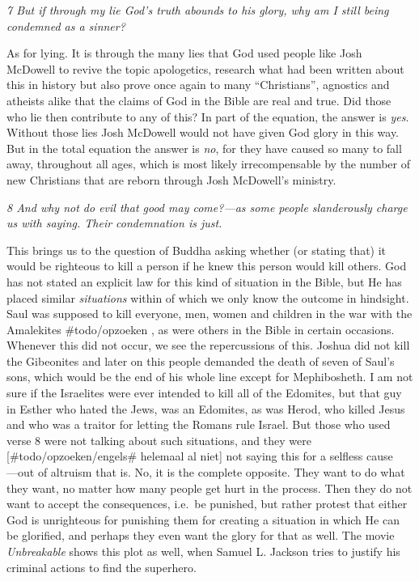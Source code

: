 \emph{7 But if through my lie God's truth abounds to his glory, why am I
still being condemned as a sinner?}

As for lying. It is through the many lies that God used people like Josh
McDowell to revive the topic apologetics, research what had been written
about this in history but also prove once again to many ``Christians'',
agnostics and atheists alike that the claims of God in the Bible are
real and true. Did those who lie then contribute to any of this? In part
of the equation, the answer is \emph{yes}. Without those lies Josh
McDowell would not have given God glory in this way. But in the total
equation the answer is \emph{no}, for they have caused so many to fall
away, throughout all ages, which is most likely irrecompensable by the
number of new Christians that are reborn through Josh McDowell's
ministry.

\emph{8 And why not do evil that good may come?---as some people
slanderously charge us with saying. Their condemnation is just.}

This brings us to the question of Buddha asking whether (or stating
that) it would be righteous to kill a person if he knew this person
would kill others. God has not stated an explicit law for this kind of
situation in the Bible, but He has placed similar \emph{situations}
within of which we only know the outcome in hindsight. Saul was supposed
to kill everyone, men, women and children in the war with the Amalekites
\#todo/opzoeken , as were others in the Bible in certain occasions.
Whenever this did not occur, we see the repercussions of this. Joshua
did not kill the Gibeonites and later on this people demanded the death
of seven of Saul's sons, which would be the end of his whole line except
for Mephibosheth. I am not sure if the Israelites were ever intended to
kill all of the Edomites, but that guy in Esther who hated the Jews, was
an Edomites, as was Herod, who killed Jesus and who was a traitor for
letting the Romans rule Israel. But those who used verse 8 were not
talking about such situations, and they were {[}\#todo/opzoeken/engels\#
helemaal al niet{]} not saying this for a selfless cause\\
---out of altruism that is. No, it is the complete opposite. They want
to do what they want, no matter how many people get hurt in the process.
Then they do not want to accept the consequences, i.e.~be punished, but
rather protest that either God is unrighteous for punishing them for
creating a situation in which He can be glorified, and perhaps they even
want the glory for that as well. The movie \emph{Unbreakable} shows this
plot as well, when Samuel L. Jackson tries to justify his criminal
actions to find the superhero.

